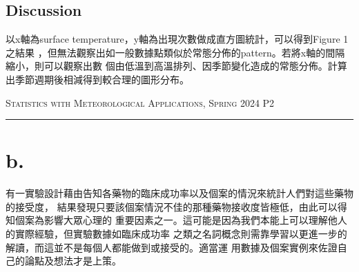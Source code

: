 \documentclass{article}
\begin{document}
\begin{CJK*}{UTF8}{bsmi}
\subsection*{Discussion}
\begin{spacing}{2}
    \begin{large}
        以x軸為surface temperature，y軸為出現次數做成直方圖統計，可以得到Figure 1之結果
        ，但無法觀察出如一般數據點類似於常態分佈的pattern。若將x軸的間隔縮小，則可以觀察出數
        個由低溫到高溫排列、因季節變化造成的常態分佈。計算出季節週期後相減得到較合理的圖形分布。
    \end{large}
\end{spacing}

\newpage

\thispagestyle{empty}
\hfill {\scshape \large Statistics with Meteorological Applications, Spring 2024} \hfill {\scshape P2}
\smallskip
\hrule
\bigskip
\bigskip
\bigskip

\section*{b.}
\begin{spacing}{2}
    \begin{large}
        有一實驗設計藉由告知各藥物的臨床成功率以及個案的情況來統計人們對這些藥物的接受度，
        結果發現只要該個案情況不佳的那種藥物接收度皆極低，由此可以得知個案為影響大眾心理的
        重要因素之一。這可能是因為我們本能上可以理解他人的實際經驗，但實驗數據如臨床成功率
        之類之名詞概念則需靠學習以更進一步的解讀，而這並不是每個人都能做到或接受的。適當運
        用數據及個案實例來佐證自己的論點及想法才是上策。
    \end{large}
\end{spacing}







\end{CJK*}
\end{document}
